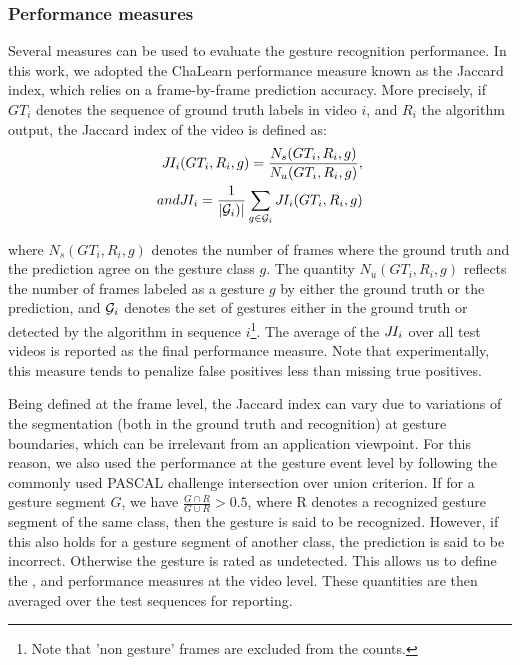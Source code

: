 \subsubsection{Performance measures}

Several measures can be used to evaluate the gesture recognition performance.
%
In this work, we adopted the ChaLearn performance measure known as the Jaccard index, which relies on a frame-by-frame prediction accuracy.
More precisely, if $GT_i$ denotes the sequence of ground truth labels in video $i$, and $R_i$ the algorithm output, the Jaccard index
of the video is defined as:
\begin{align}
\jaccardindex_i(GT_i, R_i,g) = \frac{N_s(GT_i, R_i,g)}{N_u(GT_i, R_i,g)},
\\
\mbox{and } \jaccardindex_i = \frac{1}{|{\cal G}_i)|} \sum_{g \in {\cal G}_i} \jaccardindex_i(GT_i, R_i,g)
\end{align}

where $N_s(GT_i, R_i, g)$ denotes the number of frames where the ground truth and the prediction agree on the gesture class $g$. The quantity
$N_u(GT_i, R_i, g)$ reflects the number of frames labeled as a gesture $g$ by  either the ground truth or the prediction,
and ${{\cal G}_i}$ denotes the set of gestures either in the ground truth or detected by the algorithm in sequence $i$\footnote{Note that 'non gesture' frames are excluded from the counts.}. The average of the $J\hspace*{-0.1em}I_i$ over all test videos is reported as the final performance measure.
%
Note that experimentally, this measure tends to penalize false positives less than missing true positives.

Being defined at the frame level, the Jaccard index can vary due to variations of the segmentation (both in the ground truth and recognition)
at gesture boundaries, which can be irrelevant from an application viewpoint.
%
For this reason, we also used the performance at the gesture event level by following the commonly used PASCAL challenge intersection over union criterion.
If for a gesture segment $G$, we have $\frac{G \cap R}{G \cup R} >  0.5$, where R denotes a recognized gesture segment of the same class, then the  gesture is said to be recognized.
%
However, if this also holds for a gesture segment of another class, the prediction is said to be incorrect.
Otherwise the gesture is rated as undetected. This allows us to define the \eventaccuracy, \eventconfused and \eventmissed performance measures at the video level.
These quantities are then averaged over the test sequences for reporting.


